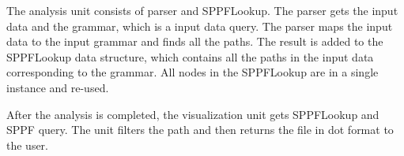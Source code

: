 The analysis unit consists of parser and SPPFLookup. The parser gets the input data and the grammar, which is a input data query.  The parser maps the input data to the input grammar and finds all the paths. The result is added to the SPPFLookup data structure, which contains all the paths in the input data corresponding to the grammar. All nodes in the SPPFLookup are in a single instance and re-used.

After the analysis is completed, the visualization unit gets SPPFLookup and SPPF query. The unit filters the path and then returns the file in dot format to the user.




